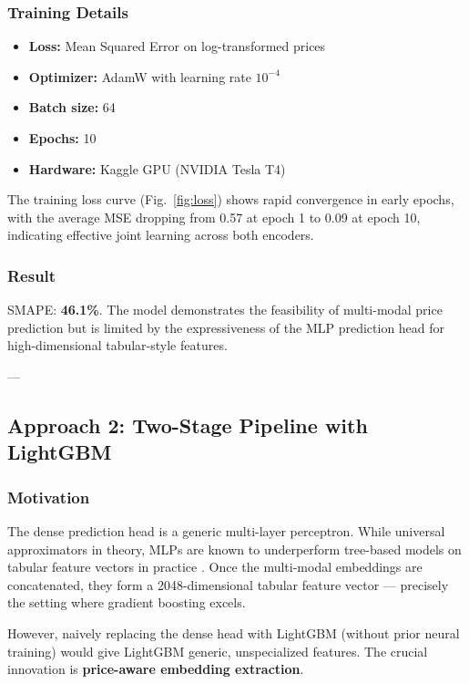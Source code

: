 \documentclass[conference]{IEEEtran}
\begin{document}
\subsubsection{Training Details}
\begin{itemize}
    \item \textbf{Loss:} Mean Squared Error on log-transformed prices
    \item \textbf{Optimizer:} AdamW with learning rate $10^{-4}$
    \item \textbf{Batch size:} 64
    \item \textbf{Epochs:} 10
    \item \textbf{Hardware:} Kaggle GPU (NVIDIA Tesla T4)
\end{itemize}

The training loss curve (Fig.~\ref{fig:loss}) shows rapid convergence in early epochs, with the average MSE dropping from 0.57 at epoch 1 to 0.09 at epoch 10, indicating effective joint learning across both encoders.

\subsubsection{Result}
SMAPE: \textbf{46.1\%}. The model demonstrates the feasibility of multi-modal price prediction but is limited by the expressiveness of the MLP prediction head for high-dimensional tabular-style features.

---

\subsection{Approach 2: Two-Stage Pipeline with LightGBM}

\subsubsection{Motivation}
The dense prediction head is a generic multi-layer perceptron. While universal approximators in theory, MLPs are known to underperform tree-based models on tabular feature vectors in practice \cite{ref4}. Once the multi-modal embeddings are concatenated, they form a 2048-dimensional tabular feature vector — precisely the setting where gradient boosting excels.

However, naively replacing the dense head with LightGBM (without prior neural training) would give LightGBM generic, unspecialized features. The crucial innovation is \textbf{price-aware embedding extraction}.
\end{document}
